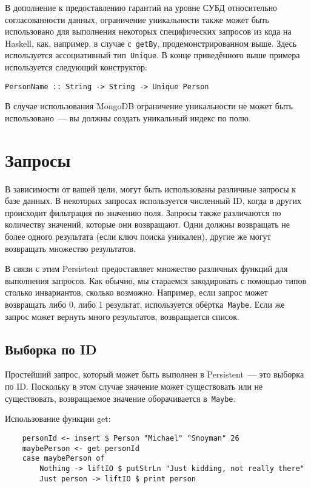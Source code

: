В дополнение к предоставлению гарантий на уровне СУБД относительно
согласованности данных, ограничение уникальности также может быть использовано
для выполнения некоторых специфических запросов из кода на Haskell, как,
например, в случае с~\lstinline'getBy', продемонстрированном выше. Здесь используется
ассоциативный тип~\lstinline'Unique'. В конце приведённого выше примера используется
следующий конструктор:

\begin{lstlisting}
PersonName :: String -> String -> Unique Person
\end{lstlisting}

\begin{remark}
    В случае использования MongoDB ограничение уникальности не может быть
    использовано~--- вы должны создать уникальный индекс по полю.
\end{remark}

\section{Запросы}

В зависимости от вашей цели, могут быть использованы различные запросы к базе
данных. В некоторых запросах используется численный ID, когда в других
происходит фильтрация по значению поля. Запросы также различаются по количеству
значений, которые они возвращают. Одни должны возвращать не более одного
результата (если ключ поиска уникален), другие же могут возвращать множество
результатов.

В связи с этим Persistent предоставляет множество различных функций для
выполнения запросов. Как обычно, мы стараемся закодировать с помощью типов
столько инвариантов, сколько возможно. Например, если запрос может возвращать
либо 0, либо 1 результат, используется обёртка~\lstinline'Maybe'. Если же
запрос может вернуть много результатов, возвращается список.

\subsection{Выборка по ID}

Простейший запрос, который может быть выполнен в Persistent~--- это выборка по
ID. Поскольку в этом случае значение может существовать или не существовать,
возвращаемое значение оборачивается в~\lstinline'Maybe'.

Использование функции get:

\begin{lstlisting}
    personId <- insert $ Person "Michael" "Snoyman" 26
    maybePerson <- get personId
    case maybePerson of
        Nothing -> liftIO $ putStrLn "Just kidding, not really there"
        Just person -> liftIO $ print person
\end{lstlisting}

